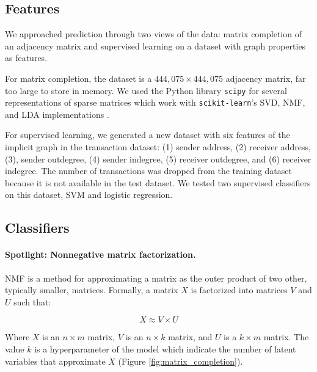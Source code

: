 \documentclass{article} %
\begin{document}
\subsection{Features}\label{features}

We approached prediction through two views of the data: matrix completion of an adjacency matrix and supervised learning on a dataset with graph properties as features.

For matrix completion, the dataset is a $444,075 \times 444,075$ adjacency matrix, far too large to store in memory. We used the Python library \texttt{scipy} for several representations of sparse matrices which work with \texttt{scikit-learn}'s SVD, NMF, and LDA implementations \cite{jones2014scipy} \cite{scikit-learn}.

For supervised learning, we generated a new dataset with six features of the implicit graph in the transaction dataset: (1) sender address, (2) receiver address, (3), sender outdegree, (4) sender indegree, (5) receiver outdegree, and (6) receiver indegree. The number of transactions was dropped from the training dataset because it is not available in the test dataset. We tested two supervised classifiers on this dataset, SVM and logistic regression.

\subsection{Classifiers}\label{classifiers}

\paragraph{Spotlight: Nonnegative matrix factorization.}\label{Spotlight}

NMF is a method for approximating a matrix as the outer product of two other, typically smaller, matrices. Formally, a matrix $X$ is factorized into matrices $V$ and $U$ such that:

\begin{equation}\label{eq:1}
X \approx V \times U
\end{equation}

Where $X$ is an $n \times m$ matrix, $V$ is an $n \times k$ matrix, and $U$ is a $k \times m$ matrix. The value $k$ is a hyperparameter of the model which indicate the number of latent variables that approximate $X$ (Figure \ref{fig:matrix_completion}).
\end{document}
